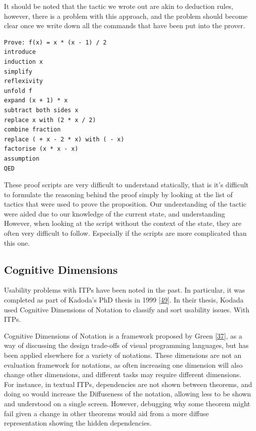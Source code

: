 \documentclass[
]{article}
\begin{document}
It should be noted that the tactic we wrote out are akin to deduction
rules, however, there is a problem with this approach, and the problem
should become clear once we write down all the commands that have been
put into the prover.

\begin{lstlisting}[caption={Final Proof script}, label=lst:final_proof_script]
Prove: f(x) = x * (x - 1) / 2
introduce
induction x
simplify
reflexivity
unfold f
expand (x + 1) * x
subtract both sides x
replace x with (2 * x / 2)
combine fraction
replace ( + x - 2 * x) with ( - x)
factorise (x * x - x)
assumption
QED
\end{lstlisting}

These proof scripts are very difficult to understand statically, that is
it's difficult to formulate the reasoning behind the proof simply by
looking at the list of tactics that were used to prove the proposition.
Our understanding of the tactic were aided due to our knowledge of the
current state, and understanding However, when looking at the script
without the context of the state, they are often very difficult to
follow. Especially if the scripts are more complicated than this one.

\hypertarget{cognitive-dimensions}{%
\subsection{Cognitive Dimensions}\label{cognitive-dimensions}}

Usability problems with ITPs have been noted in the past. In particular,
it was completed as part of Kadoda's PhD thesis in 1999
{[}\protect\hyperlink{ref-kadoda_formal_1997}{49}{]}. In their thesis,
Kodada used Cognitive Dimensions of Notation to classify and sort
usability issues. With ITPs.

Cognitive Dimensions of Notation is a framework proposed by Green
{[}\protect\hyperlink{ref-green_usability_1996}{37}{]}, as a way of
discussing the design trade-offs of visual programming languages, but
has been applied elsewhere for a variety of notations. These dimensions
are not an evaluation framework for notations, as often increasing one
dimension will also change other dimensions, and different tasks may
require different dimensions. For instance, in textual ITPs,
dependencies are not shown between theorems, and doing so would increase
the Diffuseness of the notation, allowing less to be shown and
understood on a single screen. However, debugging why some theorem might
fail given a change in other theorems would aid from a more diffuse
representation showing the hidden dependencies.
\end{document}
